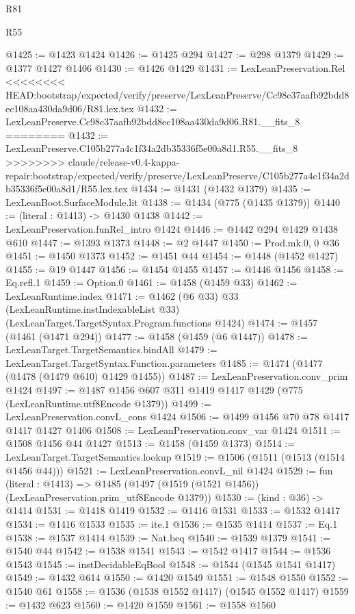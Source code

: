 \begin{lexlean}{R81}
\begin{lexlean}{R55}
\begin{coremodule}
{{{{{{{{{{{{{{{{{{{{{{{{{{{{{{{{{{{{{{{{{{{{{{{{{{{{{{{{{{{{{{@1425 := @1423 @1424
@1426 := @1425 @294
@1427 := @298 @1379
@1429 := @1377 @1427 @1406
@1430 := @1426 @1429
@1431 := LexLeanPreservation.Rel
<<<<<<<< HEAD:bootstrap/expected/verify/preserve/LexLeanPreserve/Cc98c37aafb92bdd8ec108aa430da9d06/R81.lex.tex
@1432 := LexLeanPreserve.Cc98c37aafb92bdd8ec108aa430da9d06.R81.__fits_8
========
@1432 := LexLeanPreserve.C105b277a4c1f34a2db35336f5e00a8d1.R55.__fits_8
>>>>>>>> claude/release-v0.4-kappa-repair:bootstrap/expected/verify/preserve/LexLeanPreserve/C105b277a4c1f34a2db35336f5e00a8d1/R55.lex.tex
@1434 := @1431 (@1432 @1379)
@1435 := LexLeanBoot.SurfaceModule.lit
@1438 := @1434 (@775 (@1435 @1379))
@1440 := (literal : @1413) -> @1430 @1438
@1442 := LexLeanPreservation.funRel_intro @1424
@1446 := @1442 @294 @1429 @1438 @610
@1447 := @1393 @1373
@1448 := @2 @1447
@1450 := Prod.mk.{0, 0} @36
@1451 := @1450 @1373
@1452 := @1451 @44
@1454 := @1448 (@1452 @1427)
@1455 := @19 @1447
@1456 := @1454 @1455
@1457 := @1446 @1456
@1458 := Eq.refl.{1}
@1459 := Option.{0}
@1461 := @1458 (@1459 @33)
@1462 := LexLeanRuntime.index
@1471 := @1462
    (@6 @33)
    @33
    (LexLeanRuntime.instIndexableList @33)
    (LexLeanTarget.TargetSyntax.Program.functions @1424)
@1474 := @1457 (@1461 (@1471 @294))
@1477 := @1458 (@1459 (@6 @1447))
@1478 := LexLeanTarget.TargetSemantics.bindAll
@1479 := LexLeanTarget.TargetSyntax.Function.parameters
@1485 := @1474 (@1477 (@1478 (@1479 @610) @1429 @1455))
@1487 := LexLeanPreservation.conv_prim @1424
@1497 := @1487 @1456 @607 @311 @1419 @1417 @1429 (@775 (LexLeanRuntime.utf8Encode @1379))
@1499 := LexLeanPreservation.convL_cons @1424
@1506 := @1499 @1456 @70 @78 @1417 @1417 @1427 @1406
@1508 := LexLeanPreservation.conv_var @1424
@1511 := @1508 @1456 @44 @1427
@1513 := @1458 (@1459 @1373)
@1514 := LexLeanTarget.TargetSemantics.lookup
@1519 := @1506 (@1511 (@1513 (@1514 @1456 @44)))
@1521 := LexLeanPreservation.convL_nil @1424
@1529 := fun (literal : @1413) =>
  @1485 (@1497 (@1519 (@1521 @1456)) (LexLeanPreservation.prim_utf8Encode @1379))
@1530 := (kind : @36) -> @1414
@1531 := @1418 @1419
@1532 := @1416 @1531
@1533 := @1532 @1417
@1534 := @1416 @1533
@1535 := ite.{1}
@1536 := @1535 @1414
@1537 := Eq.{1}
@1538 := @1537 @1414
@1539 := Nat.beq
@1540 := @1539 @1379
@1541 := @1540 @44
@1542 := @1538 @1541
@1543 := @1542 @1417
@1544 := @1536 @1543
@1545 := instDecidableEqBool
@1548 := @1544 (@1545 @1541 @1417)
@1549 := @1432 @614
@1550 := @1420 @1549
@1551 := @1548 @1550
@1552 := @1540 @61
@1558 := @1536 (@1538 @1552 @1417) (@1545 @1552 @1417)
@1559 := @1432 @623
@1560 := @1420 @1559
@1561 := @1558 @1560
}}}}}}}}}}}}}}}}}}}}}}}}}}}}}}}}}}}}}}}}}}}}}}}}}}}}}}}}}}}}}}
\end{coremodule}
\end{lexlean}
\end{lexlean}
